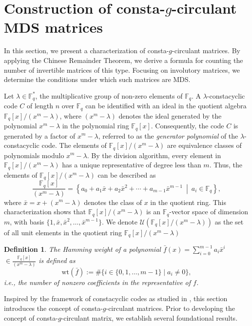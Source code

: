 \documentclass[12pt]{article}
\newtheorem{definition}{Definition}
\begin{document}
\section{Construction of consta-\(g\)-circulant MDS matrices}
In this section, we present a characterization of consta-\(g\)-circulant matrices. By applying the Chinese Remainder Theorem, we derive a formula for counting the number of invertible matrices of this type. Focusing on involutory matrices, we determine the conditions under which such matrices are MDS.

\quad Let \( \lambda \in \mathbb{F}_q^{\ast} \), the multiplicative group of non-zero elements of \( \mathbb{F}_q \). A \(\lambda\)-constacyclic code \( C \) of length \( n \) over \( \mathbb{F}_q \) can be identified with an ideal in the quotient algebra \( \mathbb{F}_q[x]/(x^m - \lambda) \), where \( (x^m - \lambda) \) denotes the ideal generated by the polynomial \( x^m - \lambda \) in the polynomial ring \( \mathbb{F}_q[x] \). Consequently, the code \( C \) is generated by a factor of \( x^m - \lambda \), referred to as the \emph{generator polynomial} of the \(\lambda\)-constacyclic code.
The elements of \( \mathbb{F}_q[x]/(x^m - \lambda) \) are equivalence classes of polynomials modulo \( x^m - \lambda \). By the division algorithm, every element in \( \mathbb{F}_q[x]/(x^m - \lambda) \) has a unique representative of degree less than \( m \). Thus, the elements of \( \mathbb{F}_q[x]/(x^m - \lambda) \) can be described as
\[
\frac{\mathbb{F}_q[x]}{(x^m - \lambda)} = \left\{ a_0 + a_1 \bar{x} + a_2 \bar{x}^2 + \cdots + a_{m-1} \bar{x}^{m-1} \ \middle|\ a_i \in \mathbb{F}_q \right\},
\]
where \( \bar{x} = x + (x^m - \lambda) \) denotes the class of \( x \) in the quotient ring. This characterization shows that \( \mathbb{F}_q[x]/(x^m - \lambda) \) is an \( \mathbb{F}_q \)-vector space of dimension \( m \), with basis \( \{ 1, \bar{x}, \bar{x}^2, \ldots, \bar{x}^{m-1} \} \). We denote $\mathcal{U}(\mathbb{F}_q[x]/(x^m - \lambda) )$ as the set of all unit elements in the quotient ring $\mathbb{F}_q[x]/(x^m - \lambda)$

\begin{definition}
	The Hamming weight of a polynomial \(\bar{f}(x) = \sum_{i=0}^{m-1} a_i \bar{x}^i\) $\in 
	\frac{\mathbb{F}_q[x]}{(x^m - \lambda)}
	$ is defined as
	\[
	\mathrm{wt}(\bar{f}) := \#\{i \in \{0, 1, \ldots, m-1\} \mid a_i \ne 0\},
	\]
	i.e., the number of nonzero coefficients in the representative of \(f\).
\end{definition}
 Inspired by the framework of constacyclic codes as studied in \cite{Bakshi2012Aclass}, this section introduces the concept of consta-$g$-circulant matrices. Prior to developing the concept of consta-$g$-circulant matrix, we establish several foundational results.
\end{document}
